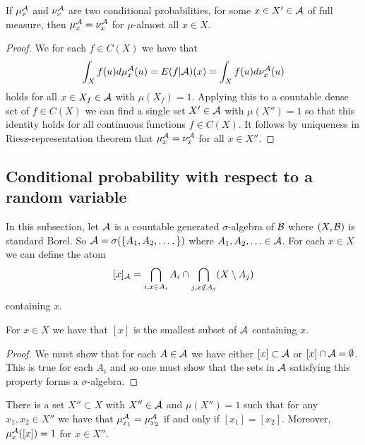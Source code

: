 \documentclass[twoside, a4paper, 10pt]{amsart}
\begin{document}
\begin{prop} If $\mu_x^{\mathcal{A}}$ and $\nu_x^{\mathcal{A}}$ are two conditional probabilities, for some $x \in X' \in \mathcal{A}$ of full measure, then $\mu_x^{\mathcal{A}} = \nu_x^{\mathcal{A}}$ for $\mu$-almost all $x \in X$.

\end{prop}

\begin{proof} We for each $f \in C(X)$ we have that $$\int_X f(u) d\mu_x^{\mathcal{A}} (u) = E(f|\mathcal{A})(x) = \int_X f(u) d\nu_x^{\mathcal{A}} (u)$$ holds for all $x \in X_f \in \mathcal{A}$ with $\mu(X_f) = 1$. Applying this to a countable dense set of $f \in C(X)$ we can find a single set $X' \in \mathcal{A}$ with $\mu(X'')=1$ so that this identity holds for all continuous functions $f \in C(X)$. It follows by uniqueness in Riesz-representation theorem that $\mu_x^{\mathcal{A}} = \nu_x^{\mathcal{A}}$ for all $x \in X''$. 

\end{proof}

\subsection{Conditional probability with respect to a random variable}

In this subsection, let $\mathcal{A}$ is a countable generated $\sigma$-algebra of $\mathcal{B}$ where $(X,\mathcal{B})$ is standard Borel. So $\mathcal{A}= \sigma(\{A_1,A_2,\ldots, \})$ where $A_1,A_2,\ldots \in \mathcal{A}$. For each $x \in X$ we can define the atom $$[x]_{\mathcal{A}} = \bigcap_{i, x \in A_i} A_i \cap \bigcap_{j, x \notin A_j} (X \setminus A_j)$$ containing $x$.

\begin{prop} For $x \in X$ we have that $[x]$ is the smallest subset of $\mathcal{A}$ containing $x$.

\end{prop}

\begin{proof} We must show that for each $A \in \mathcal{A}$ we have either $[x] \subset \mathcal{A}$ or $[x] \cap \mathcal{A} = \emptyset$. This is true for each $A_i$ and so one must show that the sets in $\mathcal{A}$ satisfying this property forms a $\sigma$-algebra. \end{proof}

\begin{prop} There is a set $X'' \subset X$ with $X'' \in \mathcal{A}$ and $\mu(X'')=1$ such that for any $x_1,x_2 \in X''$ we have that $\mu_{x_1}^{\mathcal{A}} = \mu_{x_2}^{\mathcal{A}}$ if and only if $[x_1] = [x_2]$. Moreover, $\mu_x^{\mathcal{A}}([x]) = 1$ for $x \in X''$.

\end{prop}
\end{document}
